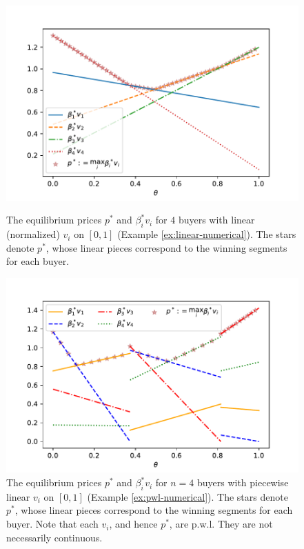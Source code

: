 \begin{figure}
\begin{minipage}{0.48\textwidth}
	\centering
	\vspace{-25pt}
	\includegraphics[scale=0.5]{codes/n-linear.pdf}
	\caption{The equilibrium prices $p^*$ and $\beta^*_i v_i$ for $4$ buyers with linear (normalized) $v_i$ on $[0,1]$ (Example \ref{ex:linear-numerical}). 
	The stars denote $p^*$, whose linear pieces correspond to the winning segments for each buyer.
	}
	\label{fig:n-linear}
\end{minipage}\hfill
\begin{minipage}{0.48\textwidth}
	\centering
	\includegraphics[scale=0.5]{codes/n-pwl.pdf}
	\caption{The equilibrium prices $p^*$ and $\beta^*_i v_i$ for $n=4$ buyers with piecewise linear $v_i$ on $[0,1]$ (Example \ref{ex:pwl-numerical}). The stars denote $p^*$, whose linear pieces correspond to the winning segments for each buyer.
	Note that each $v_i$, and hence $p^*$, are p.w.l. They are not necessarily continuous.}
	\label{fig:n-pwl}
\end{minipage}
\end{figure}

